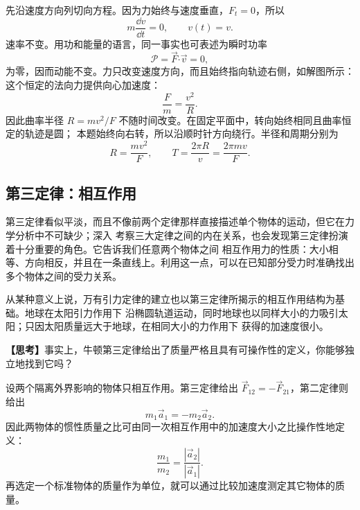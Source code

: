 \begin{xesolution}
先沿速度方向列切向方程。因为力始终与速度垂直，$F_t=0$，所以
\[
 m\frac{\dd v}{\dd t}=0,\qquad v(t)=v.
\]
速率不变。用功和能量的语言，同一事实也可表述为瞬时功率
\[
  \mathcal P=\vec F\mathbin{\boldsymbol\cdot}\vec v=0,
\]
为零，因而动能不变。力只改变速度方向，而且始终指向轨迹右侧，如解图所示：
\soldiagTwoSeven
这个恒定的法向力提供向心加速度：
\[
  \frac{F}{m}=\frac{v^2}{R}.
\]
因此曲率半径 $R=mv^2/F$ 不随时间改变。在固定平面中，转向始终相同且曲率恒定的轨迹是圆；
本题始终向右转，所以沿顺时针方向绕行。半径和周期分别为
\[
  \boxed{R=\frac{mv^2}{F}},
  \qquad
  \boxed{T=\frac{2\pi R}{v}=\frac{2\pi mv}{F}}.
\]
\end{xesolution}

\subsection{第三定律：相互作用}

第三定律看似平淡，而且不像前两个定律那样直接描述单个物体的运动，但它在力学分析中不可缺少；深入
考察三大定律之间的内在关系，也会发现第三定律扮演着十分重要的角色。它告诉我们任意两个物体之间
相互作用力的性质：大小相等、方向相反，并且在一条直线上。利用这一点，可以在已知部分受力时准确找出
多个物体之间的受力关系。

从某种意义上说，万有引力定律的建立也以第三定律所揭示的相互作用结构为基础。地球在太阳引力作用下
沿椭圆轨道运动，同时地球也以同样大小的力吸引太阳；只因太阳质量远大于地球，在相同大小的力作用下
获得的加速度很小。

\noindent\textbf{【思考】}事实上，牛顿第三定律给出了质量严格且具有可操作性的定义，你能够独立地找到它吗？

\begin{thinkanswer}
设两个隔离外界影响的物体只相互作用。第三定律给出 $\vec F_{12}=-\vec F_{21}$，第二定律则给出
\[
  m_1\vec a_1=-m_2\vec a_2.
\]
因此两物体的惯性质量之比可由同一次相互作用中的加速度大小之比操作性地定义：
\[
  \boxed{\frac{m_1}{m_2}=\frac{|\vec a_2|}{|\vec a_1|}}.
\]
再选定一个标准物体的质量作为单位，就可以通过比较加速度测定其它物体的质量。
\end{thinkanswer}

